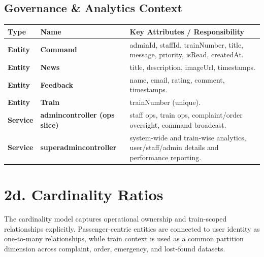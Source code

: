 \documentclass[12pt,a4paper]{report}
\renewcommand{\toprule}{\hline\hline}
\renewcommand{\midrule}{\hline}
\renewcommand{\bottomrule}{\hline\hline}
\begin{document}
\subsection{Governance \& Analytics Context}
\begin{table}[H]
\centering
\begin{tabularx}{\textwidth}{>{\bfseries}p{} >{\bfseries}p{} Y}
\toprule
{}
\textcolor{TableHeaderText}{Type} & \textcolor{TableHeaderText}{Name} & \textcolor{TableHeaderText}{Key Attributes / Responsibility} \\
\midrule
Entity & Command & adminId, staffId, trainNumber, title, message, priority, isRead, createdAt. \\
Entity & News & title, description, imageUrl, timestamps. \\
Entity & Feedback & name, email, rating, comment, timestamps. \\
Entity & Train & trainNumber (unique). \\
Service & admincontroller (ops slice) & staff ops, train ops, complaint/order oversight, command broadcast. \\
Service & superadmincontroller & system-wide and train-wise analytics, user/staff/admin details and performance reporting. \\
\bottomrule
\end{tabularx}
\end{table}

\section{2d. Cardinality Ratios}

The cardinality model captures operational ownership and train-scoped relationships explicitly. Passenger-centric entities are connected to user identity as one-to-many relationships, while train context is used as a common partition dimension across complaint, order, emergency, and lost-found datasets.
\end{document}

